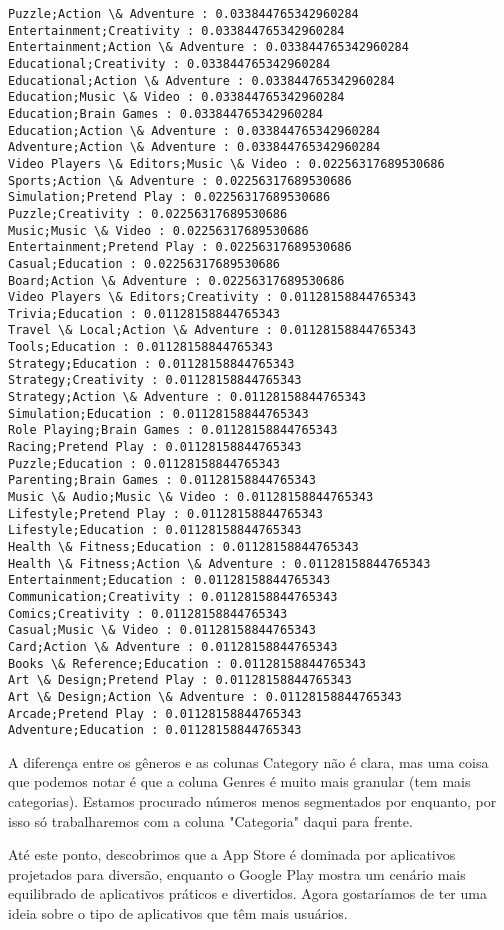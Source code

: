 \documentclass[11pt]{article}
\begin{document}
\begin{Verbatim}[commandchars=\\\{\}]
Puzzle;Action \& Adventure : 0.033844765342960284
Entertainment;Creativity : 0.033844765342960284
Entertainment;Action \& Adventure : 0.033844765342960284
Educational;Creativity : 0.033844765342960284
Educational;Action \& Adventure : 0.033844765342960284
Education;Music \& Video : 0.033844765342960284
Education;Brain Games : 0.033844765342960284
Education;Action \& Adventure : 0.033844765342960284
Adventure;Action \& Adventure : 0.033844765342960284
Video Players \& Editors;Music \& Video : 0.02256317689530686
Sports;Action \& Adventure : 0.02256317689530686
Simulation;Pretend Play : 0.02256317689530686
Puzzle;Creativity : 0.02256317689530686
Music;Music \& Video : 0.02256317689530686
Entertainment;Pretend Play : 0.02256317689530686
Casual;Education : 0.02256317689530686
Board;Action \& Adventure : 0.02256317689530686
Video Players \& Editors;Creativity : 0.01128158844765343
Trivia;Education : 0.01128158844765343
Travel \& Local;Action \& Adventure : 0.01128158844765343
Tools;Education : 0.01128158844765343
Strategy;Education : 0.01128158844765343
Strategy;Creativity : 0.01128158844765343
Strategy;Action \& Adventure : 0.01128158844765343
Simulation;Education : 0.01128158844765343
Role Playing;Brain Games : 0.01128158844765343
Racing;Pretend Play : 0.01128158844765343
Puzzle;Education : 0.01128158844765343
Parenting;Brain Games : 0.01128158844765343
Music \& Audio;Music \& Video : 0.01128158844765343
Lifestyle;Pretend Play : 0.01128158844765343
Lifestyle;Education : 0.01128158844765343
Health \& Fitness;Education : 0.01128158844765343
Health \& Fitness;Action \& Adventure : 0.01128158844765343
Entertainment;Education : 0.01128158844765343
Communication;Creativity : 0.01128158844765343
Comics;Creativity : 0.01128158844765343
Casual;Music \& Video : 0.01128158844765343
Card;Action \& Adventure : 0.01128158844765343
Books \& Reference;Education : 0.01128158844765343
Art \& Design;Pretend Play : 0.01128158844765343
Art \& Design;Action \& Adventure : 0.01128158844765343
Arcade;Pretend Play : 0.01128158844765343
Adventure;Education : 0.01128158844765343

    \end{Verbatim}
A diferença entre os gêneros e as colunas Category não é clara, mas uma coisa que podemos notar é que a coluna Genres é muito mais granular (tem mais categorias). Estamos procurado números menos segmentados por enquanto, por isso só trabalharemos com a coluna "Categoria" daqui para frente.

Até este ponto, descobrimos que a App Store é dominada por aplicativos projetados para diversão, enquanto o Google Play mostra um cenário mais equilibrado de aplicativos práticos e divertidos. Agora gostaríamos de ter uma ideia sobre o tipo de aplicativos que têm mais usuários.
\end{document}
